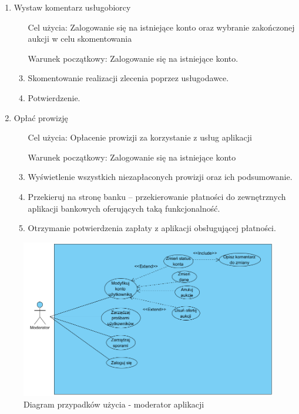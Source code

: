 \documentclass[10pt,titlepage]{article} %
\begin{document}
\begin{enumerate}[1.]
\item Wystaw komentarz usługobiorcy
\begin{enumerate}
\item[Cel użycia:] Zalogowanie się na istniejące konto oraz wybranie zakończonej aukcji w celu skomentowania
\item[Warunek początkowy:] Zalogowanie się na istniejące konto.
\item Skomentowanie realizacji zlecenia poprzez usługodawce.
\item Potwierdzenie.
\end{enumerate}

\item Opłać prowizję
\begin{enumerate}
\item[Cel użycia:] Opłacenie prowizji za korzystanie z usług aplikacji
\item[Warunek początkowy:] Zalogowanie się na istniejące konto
\item Wyświetlenie wszystkich niezapłaconych prowizji oraz ich podsumowanie.
\item Przekieruj na stronę banku – przekierowanie płatności do zewnętrznych aplikacji bankowych oferujących taką funkcjonalność.
\item Otrzymanie potwierdzenia zapłaty z aplikacji obsługującej płatności.
\end{enumerate}


\end{enumerate}

\begin{figure}[H]
\includegraphics[width=\textwidth]{img/sekcja2/moderatorPU}
\caption[Diagram przypadków użycia - moderator aplikacji]{Diagram przypadków użycia - moderator aplikacji}
\end{figure}
\end{document}
